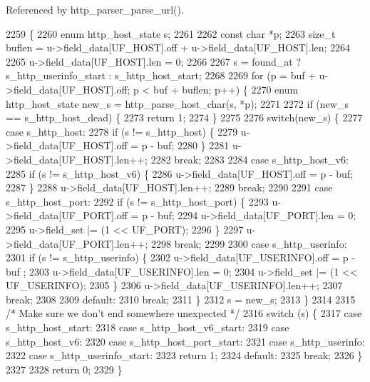 Referenced by http\+\_\+parser\+\_\+parse\+\_\+url().


\begin{DoxyCode}
2259                                                                            \{
2260   \textcolor{keyword}{enum} http_host_state s;
2261 
2262   \textcolor{keyword}{const} \textcolor{keywordtype}{char} *p;
2263   \textcolor{keywordtype}{size\_t} buflen = u->field_data[UF_HOST].off + u->field_data[UF_HOST].len;
2264 
2265   u->field_data[UF_HOST].len = 0;
2266 
2267   s = found\_at ? s_http_userinfo_start : s_http_host_start;
2268 
2269   \textcolor{keywordflow}{for} (p = buf + u->field_data[UF_HOST].off; p < buf + buflen; p++) \{
2270     \textcolor{keyword}{enum} http_host_state new\_s = http_parse_host_char(s, *p);
2271 
2272     \textcolor{keywordflow}{if} (new\_s == s_http_host_dead) \{
2273       \textcolor{keywordflow}{return} 1;
2274     \}
2275 
2276     \textcolor{keywordflow}{switch}(new\_s) \{
2277       \textcolor{keywordflow}{case} s_http_host:
2278         \textcolor{keywordflow}{if} (s != s_http_host) \{
2279           u->field_data[UF_HOST].off = p - buf;
2280         \}
2281         u->field_data[UF_HOST].len++;
2282         \textcolor{keywordflow}{break};
2283 
2284       \textcolor{keywordflow}{case} s_http_host_v6:
2285         \textcolor{keywordflow}{if} (s != s_http_host_v6) \{
2286           u->field_data[UF_HOST].off = p - buf;
2287         \}
2288         u->field_data[UF_HOST].len++;
2289         \textcolor{keywordflow}{break};
2290 
2291       \textcolor{keywordflow}{case} s_http_host_port:
2292         \textcolor{keywordflow}{if} (s != s_http_host_port) \{
2293           u->field_data[UF_PORT].off = p - buf;
2294           u->field_data[UF_PORT].len = 0;
2295           u->field_set |= (1 << UF_PORT);
2296         \}
2297         u->field_data[UF_PORT].len++;
2298         \textcolor{keywordflow}{break};
2299 
2300       \textcolor{keywordflow}{case} s_http_userinfo:
2301         \textcolor{keywordflow}{if} (s != s_http_userinfo) \{
2302           u->field_data[UF_USERINFO].off = p - buf ;
2303           u->field_data[UF_USERINFO].len = 0;
2304           u->field_set |= (1 << UF_USERINFO);
2305         \}
2306         u->field_data[UF_USERINFO].len++;
2307         \textcolor{keywordflow}{break};
2308 
2309       \textcolor{keywordflow}{default}:
2310         \textcolor{keywordflow}{break};
2311     \}
2312     s = new\_s;
2313   \}
2314 
2315   \textcolor{comment}{/* Make sure we don't end somewhere unexpected */}
2316   \textcolor{keywordflow}{switch} (s) \{
2317     \textcolor{keywordflow}{case} s_http_host_start:
2318     \textcolor{keywordflow}{case} s_http_host_v6_start:
2319     \textcolor{keywordflow}{case} s_http_host_v6:
2320     \textcolor{keywordflow}{case} s_http_host_port_start:
2321     \textcolor{keywordflow}{case} s_http_userinfo:
2322     \textcolor{keywordflow}{case} s_http_userinfo_start:
2323       \textcolor{keywordflow}{return} 1;
2324     \textcolor{keywordflow}{default}:
2325       \textcolor{keywordflow}{break};
2326   \}
2327 
2328   \textcolor{keywordflow}{return} 0;
2329 \}
\end{DoxyCode}
